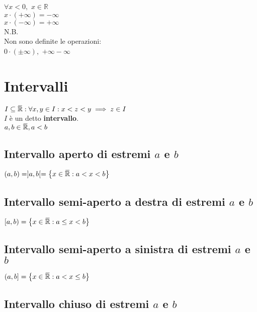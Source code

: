 \documentclass[a4paper, twoside, italian, 11pt]{book}
\newcommand{\braces}[1] {\left \{ #1 \right \}}
\newcommand{\overbar}[1] {\mkern 1.5mu\overline{\mkern-1.5mu#1\mkern-1.5mu}\mkern 1.5mu}
\newcommand{\R}{\mathbb{R}}
\begin{document}
\noindent
$\forall x < 0,$ $x \in \R$ \\
$x \cdot (+\infty) = -\infty$ \\
$x \cdot (-\infty) = +\infty$ \\

\noindent
N.B. \\
Non sono definite le operazioni: \\
$0 \cdot (\pm \infty),$ $+ \infty - \infty$



\section{Intervalli}

\noindent
$I \subseteq \overbar\R : \forall x, y \in I : x < z < y \implies z \in I$ \\
$I$ è un detto \textbf{intervallo}. \\

\noindent
$a, b \in \overbar\R, a < b$ \\


\subsection{Intervallo aperto di estremi $a$ e $b$}

\noindent
$(a, b) = ]a, b[ = \braces{ x \in \overbar\R : a < x < b}$ \\


\subsection{Intervallo semi-aperto a destra di estremi $a$ e $b$}

\noindent
$[a, b) = \braces{ x \in \overbar\R : a \leq x < b}$ \\


\subsection{Intervallo semi-aperto a sinistra di estremi $a$ e $b$}

\noindent
$(a, b] = \braces{ x \in \overbar\R : a < x \leq b}$ \\


\subsection{Intervallo chiuso di estremi $a$ e $b$}
\end{document}

